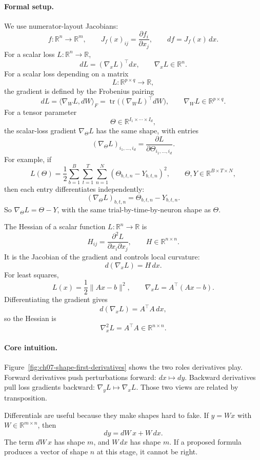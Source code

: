 \paragraph{Formal setup.}
We use numerator-layout Jacobians:
\[
f:\mathbb{R}^n\to\mathbb{R}^m,
\qquad
J_f(x)_{ij}=\frac{\partial f_i}{\partial x_j},
\qquad
df=J_f(x)\,dx.
\]
For a scalar loss \(L:\mathbb{R}^n\to\mathbb{R}\),
\[
dL=(\nabla_x L)^\top dx,
\qquad
\nabla_x L\in\mathbb{R}^n.
\]
For a scalar loss depending on a matrix
\[
L:\mathbb{R}^{p\times q}\to\mathbb{R},
\]
the gradient is defined by the Frobenius pairing
\[
dL=\langle \nabla_W L,dW\rangle_F
=\operatorname{tr}\big((\nabla_W L)^\top dW\big),
\qquad
\nabla_W L\in\mathbb{R}^{p\times q}.
\]
For a tensor parameter
\[
\Theta\in\mathbb{R}^{I_1\times\cdots\times I_d},
\]
the scalar-loss gradient \(\nabla_\Theta L\) has the same shape, with entries
\[
(\nabla_\Theta L)_{i_1,\ldots,i_d}
=\frac{\partial L}{\partial \Theta_{i_1,\ldots,i_d}}.
\]
For example, if
\[
L(\Theta)=\frac12
\sum_{b=1}^B\sum_{t=1}^T\sum_{n=1}^N
(\Theta_{b,t,n}-Y_{b,t,n})^2,
\qquad
\Theta,Y\in\mathbb{R}^{B\times T\times N},
\]
then each entry differentiates independently:
\[
(\nabla_\Theta L)_{b,t,n}=\Theta_{b,t,n}-Y_{b,t,n}.
\]
So \(\nabla_\Theta L=\Theta-Y\), with the same trial-by-time-by-neuron shape as \(\Theta\).

The Hessian of a scalar function \(L:\mathbb{R}^n\to\mathbb{R}\) is
\[
H_{ij}=\frac{\partial^2 L}{\partial x_i\partial x_j},
\qquad
H\in\mathbb{R}^{n\times n}.
\]
It is the Jacobian of the gradient and controls local curvature:
\[
d(\nabla_x L)=H\,dx.
\]
For least squares,
\[
L(x)=\frac12\|Ax-b\|^2,
\qquad
\nabla_x L=A^\top(Ax-b).
\]
Differentiating the gradient gives
\[
d(\nabla_x L)=A^\top A\,dx,
\]
so the Hessian is
\[
\nabla_x^2 L=A^\top A\in\mathbb{R}^{n\times n}.
\]

\paragraph{Core intuition.}
Figure~\ref{fig:ch07-shape-first-derivatives} shows the two roles derivatives play. Forward derivatives push perturbations forward: \(dx\mapsto dy\). Backward derivatives pull loss gradients backward: \(\nabla_y L\mapsto \nabla_x L\). Those two views are related by transposition.

Differentials are useful because they make shapes hard to fake. If \(y=Wx\) with \(W\in\mathbb{R}^{m\times n}\), then
\[
dy=dW\,x+W\,dx.
\]
The term \(dW\,x\) has shape \(m\), and \(W\,dx\) has shape \(m\). If a proposed formula produces a vector of shape \(n\) at this stage, it cannot be right.

